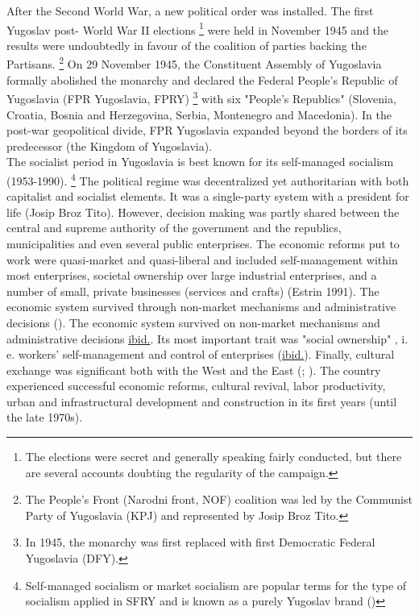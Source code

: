 \documentclass[11pt]{report}
\begin{document}
After the Second World War, a new political order was installed. The first Yugoslav post- World War II elections
\footnote{The elections were secret and generally speaking fairly conducted, but there are several accounts doubting the regularity of the campaign.}
were held in November 1945 and the results were undoubtedly in favour of the coalition of parties backing the Partisans.
\footnote{The People’s Front (Narodni front, NOF) coalition was led by the Communist Party of Yugoslavia (KPJ) and
represented by Josip Broz Tito.}
On 29 November 1945, the Constituent Assembly of Yugoslavia formally abolished the monarchy and declared the Federal People's Republic of Yugoslavia (FPR Yugoslavia, FPRY)
\footnote{In 1945, the monarchy was first replaced with  first Democratic Federal Yugoslavia (DFY).}
with six "People's Republics" (Slovenia, Croatia, Bosnia and Herzegovina, Serbia, Montenegro and Macedonia).
In the post-war geopolitical divide, FPR Yugoslavia expanded beyond the borders of its predecessor (the Kingdom of Yugoslavia).
\\

The socialist period in Yugoslavia is best known for its self-managed socialism (1953-1990).
\footnote{Self-managed socialism or market socialism are popular terms for the type of socialism applied in SFRY and is known as a purely Yugoslav brand (\href{Estrin}{\citealt{estrin_yugoslavia:_1991}})}
The political regime was decentralized yet authoritarian with both capitalist and socialist elements. It was a single-party system with a president for life (Josip Broz Tito). However, decision making was partly shared between the central and supreme authority of the government and the republics, municipalities and even several public enterprises. The economic reforms put to work were quasi-market and quasi-liberal and included self-management within most  enterprises, societal ownership over large industrial enterprises, and a number of small, private businesses (services and crafts) (Estrin 1991). The economic system survived through non-market mechanisms and administrative decisions (\href{Estrin}{\citealt{estrin_yugoslavia:_1991}}).
The economic system survived on non-market mechanisms and administrative decisions \href{ref}{ibid.}.
Its most important trait was "social  ownership" , i. e.  workers' self-management and control of  enterprises (\href{ref}{ibid.}).
Finally, cultural exchange was significant both with the West and the East  (\href{Hirt}{\citealt{hirt_belgrade_2009}}; \href{Vujosevic}{\citealt{vujosevic_conundrum_2012}}).
The country experienced successful economic reforms, cultural revival, labor productivity, urban and infrastructural development and construction in its first years (until the late 1970s).
\\
\end{document}
